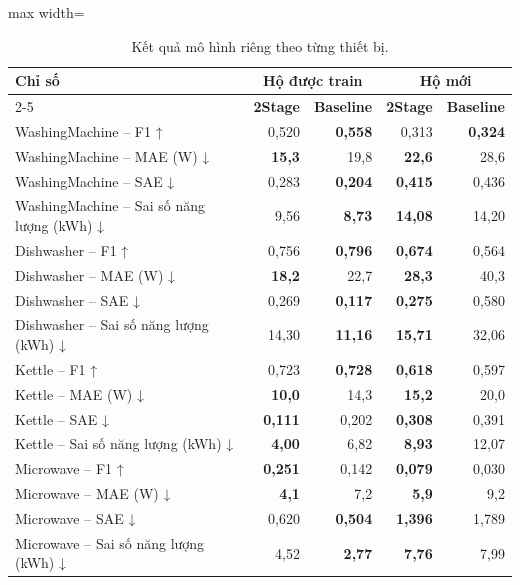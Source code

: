 \begin{table}[H]
\centering
\caption{Kết quả mô hình riêng theo từng thiết bị.}\label{nilm:tab6}
\footnotesize
\setlength{\tabcolsep}{3.5pt}\renewcommand{\arraystretch}{1.12}
\begin{adjustbox}{max width=\linewidth}
\begin{tabular}{|l|r|r|r|r|}
\hline
\multirow{2}{*}{\textbf{Chỉ số}} & \multicolumn{2}{c|}{\textbf{Hộ được train}} & \multicolumn{2}{c|}{\textbf{Hộ mới}} \\ \cline{2-5}
 & \multicolumn{1}{c|}{\textbf{2Stage}} & \multicolumn{1}{c|}{\textbf{Baseline}} & \multicolumn{1}{c|}{\textbf{2Stage}} & \multicolumn{1}{c|}{\textbf{Baseline}} \\ \hline
WashingMachine – F1 ↑ & 0,520 & \textbf{0,558} & 0,313 & \textbf{0,324} \\ \hline
WashingMachine – MAE (W) ↓ & \textbf{15,3} & 19,8 & \textbf{22,6} & 28,6 \\ \hline
WashingMachine – SAE ↓ & 0,283 & \textbf{0,204} & \textbf{0,415} & 0,436 \\ \hline
WashingMachine – Sai số năng lượng (kWh) ↓ & 9,56 & \textbf{8,73} & \textbf{14,08} & 14,20 \\ \hline
Dishwasher – F1 ↑ & 0,756 & \textbf{0,796} & \textbf{0,674} & 0,564 \\ \hline
Dishwasher – MAE (W) ↓ & \textbf{18,2} & 22,7 & \textbf{28,3} & 40,3 \\ \hline
Dishwasher – SAE ↓ & 0,269 & \textbf{0,117} & \textbf{0,275} & 0,580 \\ \hline
Dishwasher – Sai số năng lượng (kWh) ↓ & 14,30 & \textbf{11,16} & \textbf{15,71} & 32,06 \\ \hline
Kettle – F1 ↑ & 0,723 & \textbf{0,728} & \textbf{0,618} & 0,597 \\ \hline
Kettle – MAE (W) ↓ & \textbf{10,0} & 14,3 & \textbf{15,2} & 20,0 \\ \hline
Kettle – SAE ↓ & \textbf{0,111} & 0,202 & \textbf{0,308} & 0,391 \\ \hline
Kettle – Sai số năng lượng (kWh) ↓ & \textbf{4,00} & 6,82 & \textbf{8,93} & 12,07 \\ \hline
Microwave – F1 ↑ & \textbf{0,251} & 0,142 & \textbf{0,079} & 0,030 \\ \hline
Microwave – MAE (W) ↓ & \textbf{4,1} & 7,2 & \textbf{5,9} & 9,2 \\ \hline
Microwave – SAE ↓ & 0,620 & \textbf{0,504} & \textbf{1,396} & 1,789 \\ \hline
Microwave – Sai số năng lượng (kWh) ↓ & 4,52 & \textbf{2,77} & \textbf{7,76} & 7,99 \\ \hline
\end{tabular}
\end{adjustbox}
\end{table}

